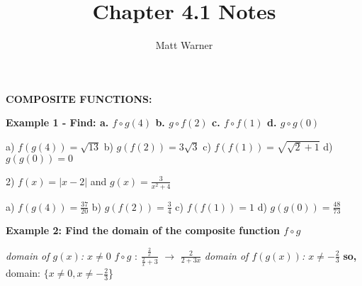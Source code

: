 \documentclass{report}
\title{\Huge{Chapter 4.1 Notes}}
\author{\huge{Matt Warner}}
\date{\huge{}}
\begin{document}
\maketitle
\begin{Large}
	\noindent \textbf{COMPOSITE FUNCTIONS:}
\end{Large}	
\bigbreak \noindent \bigbreak \noindent
{}
\bigbreak
\noindent {}
\bigbreak \noindent
\begin{mdframed}
	\begin{center}

		\textbf{Example 1 - Find: a. $f \circ g(4)$ b. $g \circ f(2)$ c. $f \circ f(1)$ d. $g \circ g(0)$}

	\end{center}
\end{mdframed}

\bigbreak
\begin{center}
\end{center}
\bigbreak
{}
\noindent a) $f(g(4)) = \sqrt{13}$
\bigbreak
b) $g(f(2)) = 3\sqrt{3}$
\bigbreak
c) $f(f(1)) = \sqrt{\sqrt{2} +1}$
\bigbreak
d) $g(g(0)) = 0$
\bigbreak
\begin{center}
	2) $ f(x) = | x-2 |$ and $g(x) = \frac{3}{x^2+4}$
  
\end{center}
\bigbreak
{}

a) $ f(g(4)) = \frac{37}{20}$
\bigbreak
b) $g(f(2)) = \frac{3}{4}$
\bigbreak
c) $f(f(1)) = 1$
\bigbreak
d) $g(g(0)) = \frac{48}{73}$
\bigbreak \noindent \bigbreak \noindent
\begin{mdframed}
	\begin{center}
		\textbf{Example 2: Find the domain of the composite function $f \circ g$}
	  
	\end{center}
  
\end{mdframed}
  
\bigbreak
{}

\bigbreak
\textit{domain of $g(x)$: $x \neq{0}$}
\bigbreak
$f \circ g$ : $\frac{\frac{2}{x}}{\frac{2}{x}+3}$ $\rightarrow$ $\frac{2}{2+3x}$
\bigbreak
\textit{domain of $f(g(x))$: $x \neq{-\frac{2}{3}}$}
\bigbreak
\textbf{so,} domain: $\{x\neq{0},x\neq{-\frac{2}{3}}$\}
\bigbreak \bigbreak
{}
\end{document}
